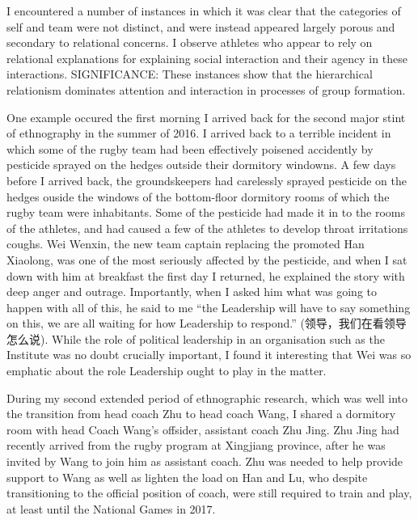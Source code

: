 
I encountered a number of instances in which it was clear that the categories of self and team were not distinct, and were instead appeared largely porous and secondary to relational concerns. I observe athletes who appear to rely on relational explanations for explaining social interaction and their agency in these interactions.
SIGNIFICANCE:  These instances show that the hierarchical relationism dominates attention and interaction in processes of group formation.

One example occured the first morning I arrived back for the second major stint of ethnography in the summer of 2016. I arrived back to a terrible incident in which some of the rugby team had been effectively poisened accidently by pesticide sprayed on the hedges outside their dormitory windowns.  A few days before I arrived back, the groundskeepers had carelessly sprayed pesticide on the hedges ouside the windows of the bottom-floor dormitory rooms of which the rugby team were inhabitants.  Some of the pesticide had made it in to the rooms of the athletes, and had caused a few of the athletes to develop throat irritations coughs.  Wei Wenxin, the new team captain replacing the promoted Han Xiaolong, was one of the most seriously affected by the pesticide, and when I sat down with him at breakfast the first day I returned, he explained the story with deep anger and outrage.  Importantly, when I asked him what was going to happen with all of this, he said to me ``the Leadership will have to say something on this, we are all waiting for how Leadership to respond.'' (领导，我们在看领导怎么说). While the role of political leadership in an organisation such as the Institute was no doubt crucially important, I found it interesting that Wei was so emphatic about the role Leadership ought to play in the matter.

During my second extended period of ethnographic research, which was well into the transition from head coach Zhu to head coach Wang, I shared a dormitory room with head Coach Wang's offsider, assistant coach Zhu Jing.  Zhu Jing had recently arrived from the rugby program at Xingjiang province, after he was invited by Wang to join him as assistant coach.  Zhu was needed to help provide support to Wang as well as lighten the load on Han and Lu, who despite transitioning to the official position of coach, were still required to train and play, at least until the National Games in 2017.

